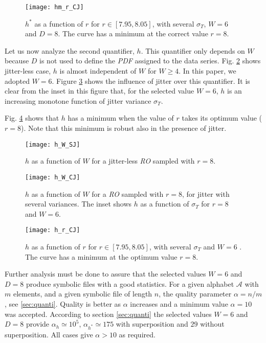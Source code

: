 \begin{figure}
\center
\texttt{[image: hm\_r\_CJ]}
\caption{$h^*$ as a function of $r$ for $r\in[7.95,8.05]$, with several $\sigma_T$, $W=6$ and $D=8$. The curve has a minimum at the correct value $r=8$.}
\label{fig:hm_r_CJ}
\end{figure}

Let us now analyze the second quantifier, $h$. This quantifier only depends on $W$ because $D$ is not used to define the \emph{PDF} assigned to the data series. Fig. \ref{fig:h_W_SJ} shows jitter-less case, $h$ is almost independent of $W$ for $W\ge4$. In this paper, we adopted $W=6$. Figure \ref{fig:h_W_CJ} shows the influence of jitter over this quantifier. It is clear from the inset in this figure that, for the selected value $W=6$, $h$ is an increasing monotone function of jitter variance $\sigma_T$.

Fig. \ref{fig:h_r_CJ} shows that $h$ has a minimum when the value of $r$ takes its optimum value ($r=8$). Note that this minimum is robust also in the presence of jitter.

\begin{figure}
\center
\texttt{[image: h\_W\_SJ]}
\caption{$h$ as a function of $W$ for a jitter-less \emph{RO} sampled with $r=8$.}
\label{fig:h_W_SJ}
\end{figure}

\begin{figure}
\center
\texttt{[image: h\_W\_CJ]}
\caption{$h$ as a function of $W$ for a \emph{RO} sampled with $r=8$, for jitter with several variances. The inset shows $h$ as a function of $\sigma_T$ for $r=8$ and $W=6$.}
\label{fig:h_W_CJ}
\end{figure}

\begin{figure}
\center
\texttt{[image: h\_r\_CJ]}
\caption{$h$ as a function of $r$ for $r\in[7.95,8.05]$, with several $\sigma_T$ and $W=6$ . The curve has a minimum at the optimum value $r=8$.}
\label{fig:h_r_CJ}
\end{figure}

Further analysis must be done to assure that the selected values $W=6$ and $D=8$ produce symbolic files with a good statistics. For a given alphabet $\mathcal{A}$ with $m$ elements, and a given symbolic file of length $n$, the quality parameter $\alpha=n/m$, see \ref{sec:quanti}. Quality is better as $\alpha$ increases and a minimum value $\alpha=10$ was accepted. According to section \ref{sec:quanti} the selected values $W=6$ and $D=8$ provide $\alpha_h\simeq10^5$, $\alpha_{h^*}\simeq175$ with superposition and $29$ without superposition. All cases give $\alpha>10$ as required.

